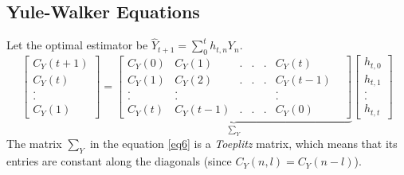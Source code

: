 \documentclass[a4paper,english,12pt]{article}
\begin{document}
\subsection{Yule-Walker Equations}
Let the optimal estimator be $\hat{Y}_{t+1}=\sum_0^t h_{t,n}Y_n.$\\
\begin{equation}
\begin{bmatrix}
C_Y(t+1)\\
C_Y(t)\\
. \\
. \\
C_Y (1)
\end{bmatrix}
=
\underbrace{\begin{bmatrix}
C_Y(0) & C_Y(1) & .& .& .& C_Y(t)\\
C_Y(1) & C_Y(2) & .&. & .& C_Y(t-1)\\ 
. & .& & &  & .&  \\
. & .& & &  & .&  \\
C_Y(t) & C_Y(t-1) & .& .& .& C_Y(0) 
\end{bmatrix}}_{\sum_Y}
\begin{bmatrix}
h_{t,0} \\
h_{t,1}\\
.\\
.\\
h_{t,t} 
\end{bmatrix} \label{eq6}
\end{equation}
The matrix $\sum_Y$ in the equation \eqref{eq6} is a \textit{Toeplitz}
matrix, which means that its entries are constant along the diagonals (since $C_Y(n,l)=C_Y(n-l)$).
\end{document}

